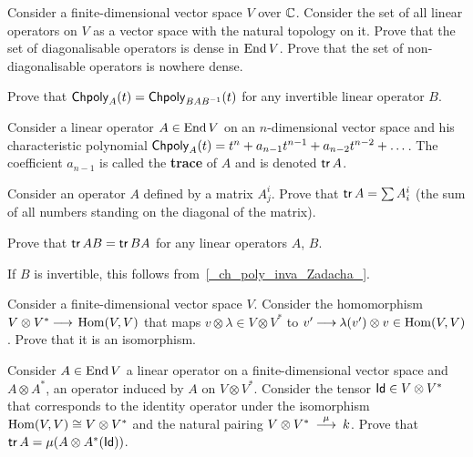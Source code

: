 \documentclass[12pt]{article}
\begin{document}
\begin{zadacha}[*]
Consider a finite-dimensional vector space $V$ over ${\mathbb C}$.
Consider the set of all linear operators on $V$ as a vector space
with the natural topology on it. Prove that the set of diagonalisable operators
is dense in $\operatorname{End} V$. Prove that the set of non-diagonalisable
operators is nowhere dense.
\end{zadacha}


\begin{zadacha}[!]\label{_ch_poly_inva_Zadacha_}
Prove that $\operatorname{\sf Chpoly}_A(t) = \operatorname{\sf Chpoly}_{B A B^{-1}}(t)$
for any invertible linear operator $B$.
\end{zadacha}

\begin{opredelenie}
Consider a linear operator $A\in \operatorname{End} V$ on an $n$-dimensional 
vector space and his characteristic polynomial
$\operatorname{\sf Chpoly}_A(t) = t^n+ a_{n-1} t^{n-1} + a_{n-2} t^{n-2} + \dots$. The
coefficient $a_{n-1}$ is called the {\bf trace} of $A$ and is denoted
$\operatorname{\sf tr} A$. 
\end{opredelenie}

\begin{zadacha}[!]
Consider an operator $A$ defined by a matrix $A^{i}_j$. Prove that 
$\operatorname{\sf tr} A= \sum A^i_i$ (the sum of all numbers standing on the diagonal of
the matrix).
\end{zadacha}

\begin{zadacha}[*]
Prove that $\operatorname{\sf tr} AB = \operatorname{\sf tr} BA$ for any linear operators $A$, $B$.
\end{zadacha}

\begin{zamechanie}
If $B$ is invertible, this follows from~\ref{_ch_poly_inva_Zadacha_}.
\end{zamechanie}

\begin{zadacha}
Consider a finite-dimensional vector space $V$. Consider the homomorphism
$V\otimes V^* {\:\longrightarrow\:} \operatorname{Hom}(V,V)$ that maps $v\otimes \lambda\in V\otimes V^*$
to $v'{\:\longrightarrow\:} \lambda(v')\otimes v\in \operatorname{Hom}(V,V)$.
Prove that it is an isomorphism.
\end{zadacha}

\begin{zadacha}[*]
Consider $A\in \operatorname{End} V$ a linear operator on a finite-dimensional
vector space and $A\otimes A^*$, an operator induced by 
$A$ on $V \otimes V^*$. Consider the tensor
$\operatorname{\sf Id}\in V \otimes V^*$ that corresponds to the identity operator under
the isomorphism $\operatorname{Hom}(V,V)\cong V\otimes V^*$ and the natural pairing
$V \otimes V^*\stackrel \mu {{\:\longrightarrow\:}} k$.  
Prove that $\operatorname{\sf tr} A = \mu(A\otimes A^*(\operatorname{\sf Id}))$.
\end{zadacha}
\end{document}
